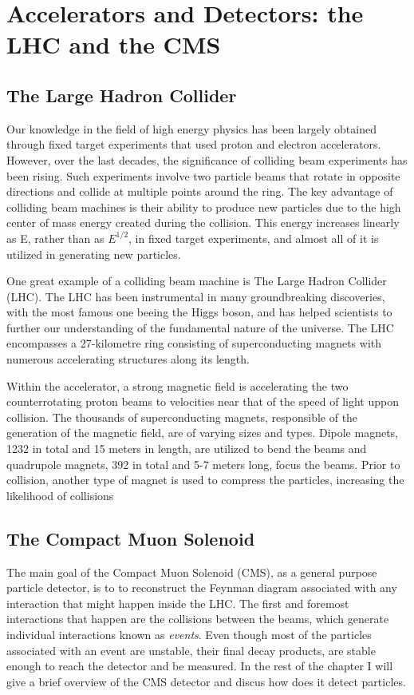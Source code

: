 
\chapter{Accelerators and Detectors: the LHC and the CMS}
\label{sec:org3878a16}
\section{The Large Hadron Collider}
\label{sec:org5906b28}
Our knowledge in the field of high energy physics has been largely obtained through fixed target experiments that used proton and electron accelerators. However, over the last decades, the significance of colliding beam experiments has been rising. Such experiments involve two particle beams that rotate in opposite directions and collide at multiple points around the ring. The key advantage of colliding beam machines is their ability to produce new particles due to the high center of mass energy created during the collision. This energy increases linearly as E, rather than as \(E^{1/2}\), in fixed target experiments, and almost all of it is utilized in generating new particles\cite{thomson_2013}.

One great example of a colliding beam machine is The Large Hadron Collider (LHC).  The LHC has been instrumental in many groundbreaking discoveries, with the most famous one beeing the Higgs boson, and has helped scientists to further our understanding of the fundamental nature of the universe. The LHC encompasses a 27-kilometre ring consisting of superconducting magnets with numerous accelerating structures along its length.

Within the accelerator, a strong magnetic field is accelerating the two counterrotating proton beams to velocities near that of the speed of light uppon collision.  The thousands of  superconducting magnets, responsible of the generation of the magnetic field, are of varying sizes and types. Dipole magnets, 1232 in total and 15 meters in length, are utilized to bend the beams and quadrupole magnets, 392 in total and 5-7 meters long, focus the beams. Prior to collision, another type of magnet is used to compress the particles, increasing the likelihood of collisions \cite{MomentumCMS}
\section{The Compact Muon Solenoid}
\label{sec:orgccfbfe1}
The main goal of  the Compact Muon Solenoid (CMS), as a general purpose particle detector, is to  to reconstruct the Feynman diagram associated with any interaction that might happen inside the LHC. The first and foremost interactions that happen are the collisions between the beams, which generate individual interactions known as \emph{events}. Even though most of the particles associated with an event are unstable, their final decay products, are stable enough to reach the detector and be measured. In the rest of the chapter I will give a brief overview of the CMS detector and discus how does it detect particles.
